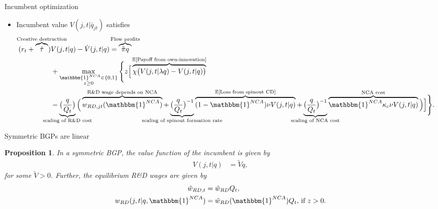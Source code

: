 \documentclass[english,usenames,dvipsnames]{beamer}
\newtheorem{proposition}{Proposition}
\begin{document}
\begin{frame}{Incumbent optimization}\label{HJB_incumbent}
\hyperlink{characterizing_BGP}{}
\begin{itemize}
\item Incumbent value $V(j,t|\bar{q}_{jt})$ satisfies
\tiny
\begin{align*}
	(r_t + \overbrace{\hat{\tau}}^{\mathclap{\text{Creative destruction}}}) &V(j,t |q) - \dot{V}(j,t|q) = \overbrace{\tilde{\pi} q }^{\mathclap{\text{Flow profits}}}\nonumber \\_{}
	&+ \max_{\substack{\mathbbm{1}^{NCA} \in \{0,1\} \\ z \ge 0}} \Bigg\{ z \Big[  \overbrace{\chi \big( V(j,t|\lambda q) - V(j,t|q)\big)}^{\mathclap{\mathbb{E}[\text{Payoff from own-innovation}]}}  \nonumber \\
	&- \underbrace{\big(\frac{q}{Q_t}\big)}_{\mathclap{\text{scaling of R\&D cost}}} \Big( \overbrace{w_{RD,jt}(\mathbbm{1}^{NCA})}^{\mathclap{\text{R\&D wage depends on NCA}}} + \underbrace{\big(\frac{q}{Q_t}\big)^{-1}}_{\mathclap{\text{scaling of spinout formation rate}}} \overbrace{(1-\mathbbm{1}^{NCA}) \nu V(j,t|q)}^{\mathclap{\mathbb{E}[\text{Loss from spinout CD}]}} + \underbrace{\big(\frac{q}{Q_t}\big)^{-1}}_{\mathclap{\text{scaling of NCA cost}}}  \overbrace{\mathbbm{1}^{NCA} \kappa_c \nu V(j,t|q) }^{\mathclap{\text{NCA cost}}}\Big)  \Big] \Bigg\}.
\end{align*}
\end{itemize}
\end{frame}


\begin{frame}{Symmetric BGPs are linear}\label{proposition:hjb_scaling}
	\hyperlink{characterizing_BGP}{}
	\small
	\begin{proposition}
		In a symmetric BGP, the value function of the incumbent is given by
		\begin{align*}
		V(j,t|q) &= \tilde{V} q,
		\end{align*}
		for some $\tilde{V} > 0$. Further, the equilibrium R\&D wages are given by 
		\begin{align*}
		\hat{w}_{RD,t} &= \hat{w}_{RD} Q_t, \\
		w_{RD}(j,t|q,\mathbbm{1}^{NCA}) &= \tilde{w}_{RD}(\mathbbm{1}^{NCA}) Q_t \textrm{, if $z > 0$}.
		\end{align*}
	\end{proposition}
\end{frame}
\end{document}
